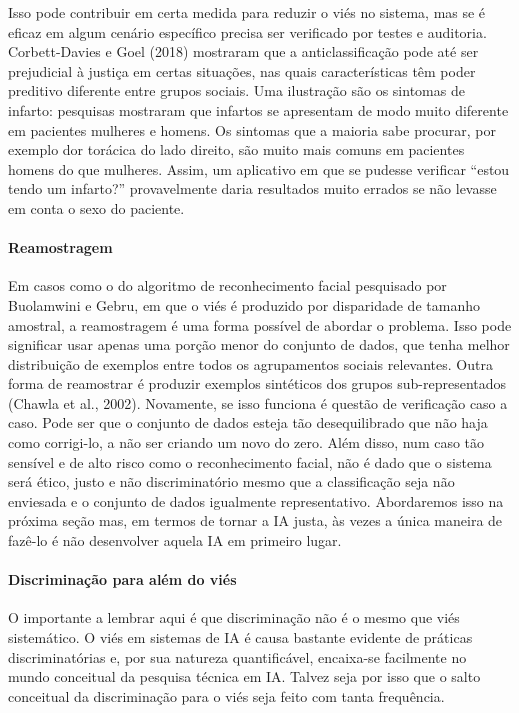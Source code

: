 \documentclass[
  11pt,
]{article}
\begin{document}
Isso pode contribuir em certa medida para reduzir o viés no sistema, mas
se é eficaz em algum cenário específico precisa ser verificado por
testes e auditoria. Corbett-Davies e Goel (2018) mostraram que a
anticlassificação pode até ser prejudicial à justiça em certas
situações, nas quais características têm poder preditivo diferente entre
grupos sociais. Uma ilustração são os sintomas de infarto: pesquisas
mostraram que infartos se apresentam de modo muito diferente em
pacientes mulheres e homens. Os sintomas que a maioria sabe procurar,
por exemplo dor torácica do lado direito, são muito mais comuns em
pacientes homens do que mulheres. Assim, um aplicativo em que se pudesse
verificar ``estou tendo um infarto?'' provavelmente daria resultados
muito errados se não levasse em conta o sexo do paciente.

\paragraph{Reamostragem}\label{reamostragem}

Em casos como o do algoritmo de reconhecimento facial pesquisado por
Buolamwini e Gebru, em que o viés é produzido por disparidade de tamanho
amostral, a reamostragem é uma forma possível de abordar o problema.
Isso pode significar usar apenas uma porção menor do conjunto de dados,
que tenha melhor distribuição de exemplos entre todos os agrupamentos
sociais relevantes. Outra forma de reamostrar é produzir exemplos
sintéticos dos grupos sub-representados (Chawla et al., 2002).
Novamente, se isso funciona é questão de verificação caso a caso. Pode
ser que o conjunto de dados esteja tão desequilibrado que não haja como
corrigi-lo, a não ser criando um novo do zero. Além disso, num caso tão
sensível e de alto risco como o reconhecimento facial, não é dado que o
sistema será ético, justo e não discriminatório mesmo que a
classificação seja não enviesada e o conjunto de dados igualmente
representativo. Abordaremos isso na próxima seção mas, em termos de
tornar a IA justa, às vezes a única maneira de fazê-lo é não desenvolver
aquela IA em primeiro lugar.

\paragraph{Discriminação para além do
viés}\label{discriminauxe7uxe3o-para-aluxe9m-do-viuxe9s}

O importante a lembrar aqui é que discriminação não é o mesmo que viés
sistemático. O viés em sistemas de IA é causa bastante evidente de
práticas discriminatórias e, por sua natureza quantificável, encaixa-se
facilmente no mundo conceitual da pesquisa técnica em IA. Talvez seja
por isso que o salto conceitual da discriminação para o viés seja feito
com tanta frequência.
\end{document}
